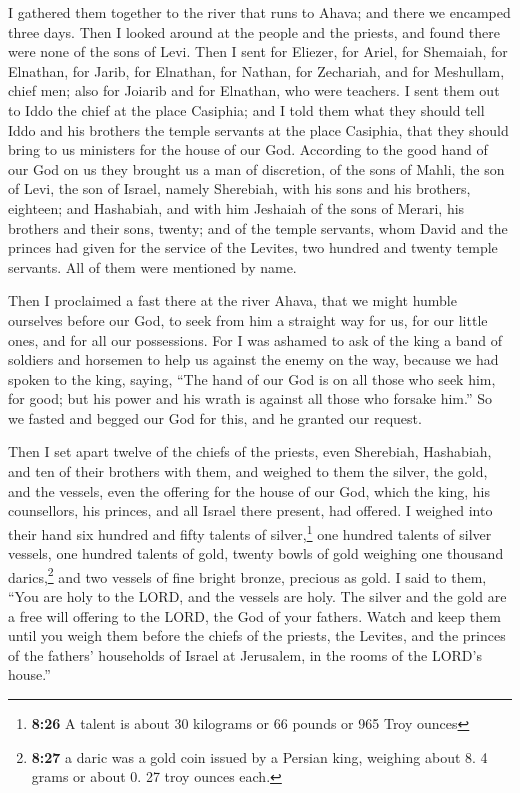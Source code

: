  I gathered them together to the river that runs to
Ahava; and there we encamped three days. Then I looked around at the
people and the priests, and found there were none of the sons of Levi.
 Then I sent for Eliezer, for Ariel, for Shemaiah, for
Elnathan, for Jarib, for Elnathan, for Nathan, for Zechariah, and for
Meshullam, chief men; also for Joiarib and for Elnathan, who were
teachers.  I sent them out to Iddo the chief at the place
Casiphia; and I told them what they should tell Iddo and his brothers
the temple servants at the place Casiphia, that they should bring to us
ministers for the house of our God.  According to the
good hand of our God on us they brought us a man of discretion, of the
sons of Mahli, the son of Levi, the son of Israel, namely Sherebiah,
with his sons and his brothers, eighteen;  and Hashabiah,
and with him Jeshaiah of the sons of Merari, his brothers and their
sons, twenty;  and of the temple servants, whom David and
the princes had given for the service of the Levites, two hundred and
twenty temple servants. All of them were mentioned by name.

 Then I proclaimed a fast there at the river Ahava, that
we might humble ourselves before our God, to seek from him a straight
way for us, for our little ones, and for all our possessions.
 For I was ashamed to ask of the king a band of soldiers
and horsemen to help us against the enemy on the way, because we had
spoken to the king, saying, ``The hand of our God is on all those who
seek him, for good; but his power and his wrath is against all those who
forsake him.''  So we fasted and begged our God for this,
and he granted our request.

 Then I set apart twelve of the chiefs of the priests,
even Sherebiah, Hashabiah, and ten of their brothers with them,
 and weighed to them the silver, the gold, and the
vessels, even the offering for the house of our God, which the king, his
counsellors, his princes, and all Israel there present, had offered.
 I weighed into their hand six hundred and fifty talents
of silver,\footnote{\textbf{8:26} A talent is about 30 kilograms or 66
  pounds or 965 Troy ounces} one hundred talents of silver vessels, one
hundred talents of gold,  twenty bowls of gold weighing
one thousand darics,\footnote{\textbf{8:27} a daric was a gold coin
  issued by a Persian king, weighing about 8. 4 grams or about 0. 27
  troy ounces each.} and two vessels of fine bright bronze, precious as
gold.  I said to them, ``You are holy to the LORD, and
the vessels are holy. The silver and the gold are a free will offering
to the LORD, the God of your fathers.  Watch and keep
them until you weigh them before the chiefs of the priests, the Levites,
and the princes of the fathers' households of Israel at Jerusalem, in
the rooms of the LORD's house.''

